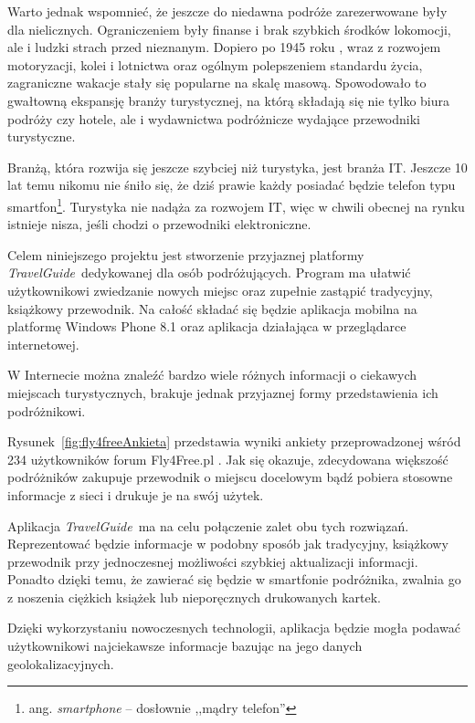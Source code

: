 \documentclass[a4paper]{book}
\newcommand{\appName}{\emph{TravelGuide}}
\begin{document}
			Warto jednak wspomnieć, że jeszcze do niedawna podróże zarezerwowane były dla nielicznych. Ograniczeniem były  finanse i brak szybkich środków lokomocji, ale i ludzki strach przed nieznanym. Dopiero po 1945 roku \cite{id:historia_podrozy}, wraz z rozwojem motoryzacji, kolei i lotnictwa oraz ogólnym polepszeniem standardu życia, zagraniczne wakacje stały się popularne na skalę masową. Spowodowało to gwałtowną ekspansję branży turystycznej, na którą składają się nie tylko biura podróży czy hotele, ale i wydawnictwa podróżnicze wydające przewodniki turystyczne. 
			
			Branżą, która rozwija się jeszcze szybciej niż turystyka, jest branża IT. Jeszcze 10 lat temu nikomu nie śniło się, że dziś prawie każdy posiadać będzie telefon typu smartfon\footnote{ang. \emph{smartphone} -- dosłownie ,,mądry telefon''}. Turystyka nie nadąża za rozwojem IT, więc w chwili obecnej na rynku istnieje nisza, jeśli chodzi o przewodniki elektroniczne.
			
			Celem niniejszego projektu jest stworzenie przyjaznej platformy \appName\ dedykowanej dla osób podróżujących. Program ma ułatwić użytkownikowi zwiedzanie nowych miejsc oraz zupełnie zastąpić tradycyjny, książkowy przewodnik. Na całość składać się będzie aplikacja mobilna na platformę Windows Phone 8.1 oraz aplikacja działająca w przeglądarce internetowej. 
			
			W Internecie można znaleźć bardzo wiele różnych informacji o ciekawych miejscach turystycznych, brakuje jednak przyjaznej formy przedstawienia ich podróżnikowi. 
			
			Rysunek~\ref{fig:fly4freeAnkieta} przedstawia wyniki ankiety przeprowadzonej wśród 234 użytkowników forum Fly4Free.pl \cite{id:fly4free}. Jak się okazuje, zdecydowana większość podróżników zakupuje przewodnik o miejscu docelowym bądź pobiera stosowne informacje z sieci i drukuje je na swój użytek.
			
			Aplikacja \appName\ ma na celu połączenie zalet obu tych rozwiązań. Reprezentować będzie informacje w podobny sposób jak tradycyjny, książkowy przewodnik przy jednoczesnej możliwości szybkiej aktualizacji informacji. Ponadto dzięki temu, że zawierać się będzie w smartfonie podróżnika, zwalnia go z noszenia ciężkich książek lub nieporęcznych drukowanych kartek. 
			
			Dzięki wykorzystaniu nowoczesnych technologii, aplikacja będzie mogła podawać użytkownikowi najciekawsze informacje bazując na jego danych geolokalizacyjnych.  
			
\end{document}
